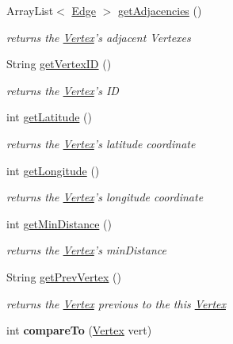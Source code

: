 \begin{DoxyCompactItemize}
Array\+List$<$ \hyperlink{class_edge}{Edge} $>$ \hyperlink{class_vertex_a0e50bba961059c18d09eae9e4e7ddae6}{get\+Adjacencies} ()
\begin{DoxyCompactList}\small\item\em returns the \hyperlink{class_vertex}{Vertex}'s adjacent Vertexes \end{DoxyCompactList}\item 
String \hyperlink{class_vertex_a90c55a439ee38096f6793d8b53213927}{get\+Vertex\+I\+D} ()
\begin{DoxyCompactList}\small\item\em returns the \hyperlink{class_vertex}{Vertex}'s I\+D \end{DoxyCompactList}\item 
int \hyperlink{class_vertex_a1e30dae20c0f1e9583072b73261fd671}{get\+Latitude} ()
\begin{DoxyCompactList}\small\item\em returns the \hyperlink{class_vertex}{Vertex}'s latitude coordinate \end{DoxyCompactList}\item 
int \hyperlink{class_vertex_a9cc090eee3ea349c68d721e9d447e6c4}{get\+Longitude} ()
\begin{DoxyCompactList}\small\item\em returns the \hyperlink{class_vertex}{Vertex}'s longitude coordinate \end{DoxyCompactList}\item 
int \hyperlink{class_vertex_a184927c05667f9bd103f8ae3ed0d49c6}{get\+Min\+Distance} ()
\begin{DoxyCompactList}\small\item\em returns the \hyperlink{class_vertex}{Vertex}'s min\+Distance \end{DoxyCompactList}\item 
String \hyperlink{class_vertex_adc8513a28f00e0b38d99cdee8229fe06}{get\+Prev\+Vertex} ()
\begin{DoxyCompactList}\small\item\em returns the \hyperlink{class_vertex}{Vertex} previous to the this \hyperlink{class_vertex}{Vertex} \end{DoxyCompactList}\item 
\hypertarget{class_vertex_a7dcf0fc40eacb7e21a8f12682b9be8d4}{int {\bfseries compare\+To} (\hyperlink{class_vertex}{Vertex} vert)}\label{class_vertex_a7dcf0fc40eacb7e21a8f12682b9be8d4}

\end{DoxyCompactItemize}


